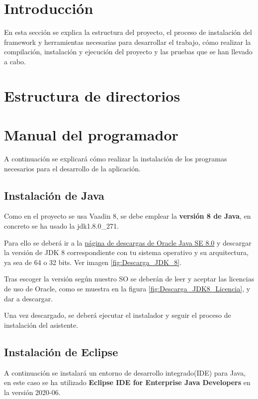 
\section{Introducción}
En esta sección se explica la estructura del proyecto, el proceso de instalación del framework y herramientas necesarias para desarrollar el trabajo, cómo realizar la compilación, instalación y ejecución del proyecto y las pruebas que se han llevado a cabo.

\section{Estructura de directorios}

\section{Manual del programador}
A continuación se explicará cómo realizar la instalación de los programas necesarios para el desarrollo de la aplicación.

\subsection{Instalación de Java}
Como en el proyecto se usa Vaadin 8, se debe emplear la \textbf{versión 8 de Java}, en concreto se ha usado la jdk1.8.0\_271.
 
Para ello se deberá ir a la \href{https://www.oracle.com/java/technologies/javase/javase-jdk8-downloads.html}{página de descargas de Oracle Java SE 8.0} y descargar la versión de JDK 8 correspondiente con tu sistema operativo y su arquitectura, ya sea de 64 o 32 bits. Ver imagen \ref{fig:Descarga_JDK_8}.

Tras escoger la versión según nuestro SO se deberán de leer y aceptar las licencias de uso de Oracle, como se muestra en la figura \ref{fig:Descarga_JDK8_Licencia}, y dar a descargar. 


Una vez descargado, se deberá ejecutar el instalador y seguir el proceso de instalación del asistente.

\subsection{Instalación de Eclipse}
A continuación se instalará un entorno de desarrollo integrado(IDE) para Java, en este caso se ha utilizado \textbf{Eclipse IDE for Enterprise Java Developers} en la versión 2020-06. 

